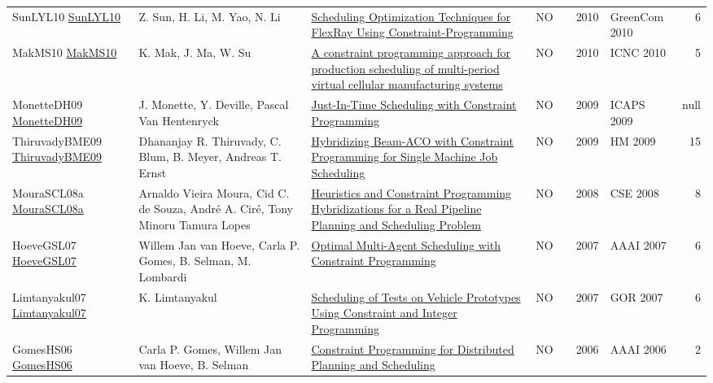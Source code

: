 {\begin{longtable}{p{3cm}p{6cm}p{7cm}rrrp{3cm}r}
SunLYL10 \href{https://doi.org/10.1109/GreenCom-CPSCom.2010.111}{SunLYL10} & Z. Sun, H. Li, M. Yao, N. Li & \href{papers/SunLYL10.pdf}{Scheduling Optimization Techniques for FlexRay Using Constraint-Programming} & NO & \cite{SunLYL10} & 2010 & GreenCom 2010 & 6\\
MakMS10 \href{https://doi.org/10.1109/ICNC.2010.5583494}{MakMS10} & K. Mak, J. Ma, W. Su & \href{papers/MakMS10.pdf}{A constraint programming approach for production scheduling of multi-period virtual cellular manufacturing systems} & NO & \cite{MakMS10} & 2010 & ICNC 2010 & 5\\
MonetteDH09 \href{http://aaai.org/ocs/index.php/ICAPS/ICAPS09/paper/view/712}{MonetteDH09} & J. Monette, Y. Deville, Pascal Van Hentenryck & \href{papers/MonetteDH09.pdf}{Just-In-Time Scheduling with Constraint Programming} & NO & \cite{MonetteDH09} & 2009 & ICAPS 2009 & null\\
ThiruvadyBME09 \href{https://doi.org/10.1007/978-3-642-04918-7\_3}{ThiruvadyBME09} & Dhananjay R. Thiruvady, C. Blum, B. Meyer, Andreas T. Ernst & \href{papers/ThiruvadyBME09.pdf}{Hybridizing Beam-ACO with Constraint Programming for Single Machine Job Scheduling} & NO & \cite{ThiruvadyBME09} & 2009 & HM 2009 & 15\\
MouraSCL08a \href{https://doi.org/10.1109/CSE.2008.24}{MouraSCL08a} & Arnaldo Vieira Moura, Cid C. de Souza, Andr{\'{e}} A. Cir{\'{e}}, Tony Minoru Tamura Lopes & \href{papers/MouraSCL08a.pdf}{Heuristics and Constraint Programming Hybridizations for a Real Pipeline Planning and Scheduling Problem} & NO & \cite{MouraSCL08a} & 2008 & CSE 2008 & 8\\
HoeveGSL07 \href{http://www.aaai.org/Library/AAAI/2007/aaai07-291.php}{HoeveGSL07} & Willem Jan van Hoeve, Carla P. Gomes, B. Selman, M. Lombardi & \href{papers/HoeveGSL07.pdf}{Optimal Multi-Agent Scheduling with Constraint Programming} & NO & \cite{HoeveGSL07} & 2007 & AAAI 2007 & 6\\
Limtanyakul07 \href{https://doi.org/10.1007/978-3-540-77903-2\_65}{Limtanyakul07} & K. Limtanyakul & \href{papers/Limtanyakul07.pdf}{Scheduling of Tests on Vehicle Prototypes Using Constraint and Integer Programming} & NO & \cite{Limtanyakul07} & 2007 & GOR 2007 & 6\\
GomesHS06 \href{http://www.aaai.org/Library/Symposia/Spring/2006/ss06-04-024.php}{GomesHS06} & Carla P. Gomes, Willem Jan van Hoeve, B. Selman & \href{papers/GomesHS06.pdf}{Constraint Programming for Distributed Planning and Scheduling} & NO & \cite{GomesHS06} & 2006 & AAAI 2006 & 2\\

\end{longtable}}
